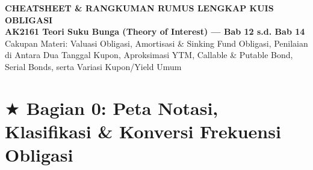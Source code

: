 \documentclass[10pt,a4paper]{article}
\begin{document}
\begin{tcolorbox}[
    enhanced,
    colback=primaryblue,
    colframe=primaryblue!80!black,
    arc=2mm,
    boxrule=1pt,
    left=4mm, right=4mm, top=3mm, bottom=3mm
]
\begin{center}
    {\color{white}\LARGE\textbf{\textsf{CHEATSHEET \& RANGKUMAN RUMUS LENGKAP KUIS OBLIGASI}}}\\[0.25em]
    {\color{white}\large\textbf{\textsf{AK2161 Teori Suku Bunga (Theory of Interest) --- Bab 12 s.d. Bab 14}}}\\[0.25em]
    {\color{white!85}\small\textsf{Cakupan Materi: Valuasi Obligasi, Amortisasi \& Sinking Fund Obligasi, Penilaian di Antara Dua Tanggal Kupon, Aproksimasi YTM, Callable \& Putable Bond, Serial Bonds, serta Variasi Kupon/Yield Umum}}
\end{center}
\end{tcolorbox}

\vspace{0.15em}

\section*{\large $\bigstar$ Bagian 0: Peta Notasi, Klasifikasi \& Konversi Frekuensi Obligasi}
\end{document}
